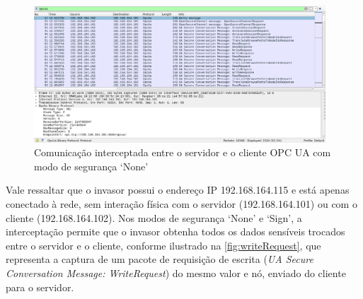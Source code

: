         \begin{figure}[htbp!]
            \caption{\label{fig:0-sniffing-wireshark}Comunicação interceptada entre o servidor e o cliente OPC UA com modo de segurança `None'}
            \begin{center}
                \includegraphics[width=0.972\textwidth]{USPSC-img/0-sniffing-wireshark-filtered-anon.png}
            \end{center}
        \end{figure}

        Vale ressaltar que o invasor possui o endereço IP 192.168.164.115 e está apenas conectado à rede, sem interação física com o servidor (192.168.164.101) ou com o cliente (192.168.164.102). Nos modos de segurança `None' e `Sign', a interceptação permite que o invasor obtenha todos os dados sensíveis trocados entre o servidor e o cliente, conforme ilustrado na \autoref{fig:writeRequest}, que representa a captura de um pacote de requisição de escrita (\textit{UA Secure Conversation Message: WriteRequest}) do mesmo valor e nó, enviado do cliente para o servidor.

